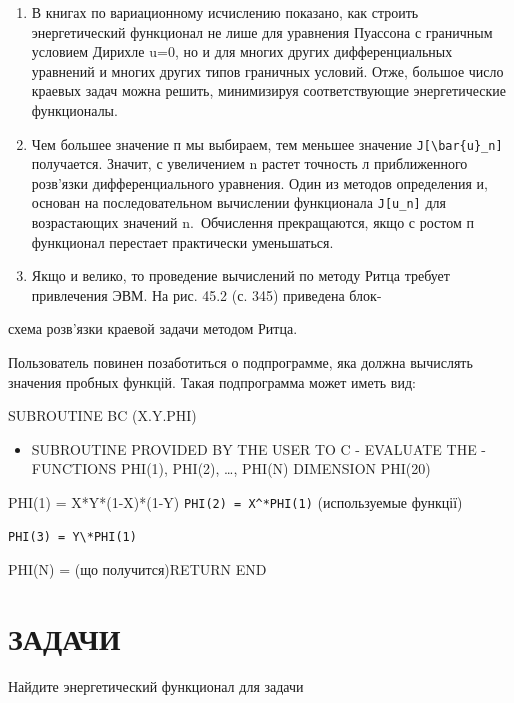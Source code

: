 \documentclass[
  ukrainian,
]{article}
\providecommand{\tightlist}{%
  \setlength{\itemsep}{0pt}\setlength{\parskip}{0pt}}
\begin{document}
\begin{enumerate}
\def\labelenumi{\arabic{enumi}.}
\setcounter{enumi}{2}
\item
  В книгах по вариационному исчислению показано, как строить
  энергетический функционал не лише для уравнения Пуассона с граничным
  условием Дирихле u=0, но и для многих других дифференциальных
  уравнений и многих других типов граничных условий. Отже, большое число
  краевых задач можна решить, минимизируя соответствующие энергетические
  функционалы.
\item
  Чем большее значение п мы выбираем, тем меньшее значение
  \texttt{J{[}\textbackslash{}bar\{u\}\_n{]}} получается. Значит, с
  увеличением n растет точность л приближенного розв'язки
  дифференциального уравнения. Один из методов определения и, основан на
  последовательном вычислении функционала \texttt{J{[}u\_n{]}} для
  возрастающих значений n.~Обчислення прекращаются, якщо с ростом п
  функционал перестает практически уменьшаться.
\item
  Якщо и велико, то проведение вычислений по методу Ритца требует
  привлечения ЭВМ. На рис. 45.2 (с. 345) приведена блок-
\end{enumerate}

схема розв'язки краевой задачи методом Ритца.

Пользователь повинен позаботиться о подпрограмме, яка должна вычислять
значения пробных функцій. Такая подпрограмма может иметь вид:

SUBROUTINE BC (X.Y.PHI)

\begin{itemize}
\tightlist
\item
  SUBROUTINE PROVIDED BY THE USER TO C - EVALUATE THE - FUNCTIONS
  PHI(1), PHI(2), \ldots, PHI(N) DIMENSION PHI(20)
\end{itemize}

PHI(1) = X*Y*(1-X)*(1-Y) \texttt{PHI(2)\ =\ X\^{}*PHI(1)} (используемые
функції)

\begin{verbatim}
PHI(3) = Y\*PHI(1)
\end{verbatim}

PHI(N) = (що получится)RETURN END

\section{\texorpdfstring{\textbf{ЗА}ДАЧИ}{ЗАДАЧИ}}\label{ux437ux430ux434ux430ux447ux438-11}

Найдите энергетический функционал для задачи
\end{document}
